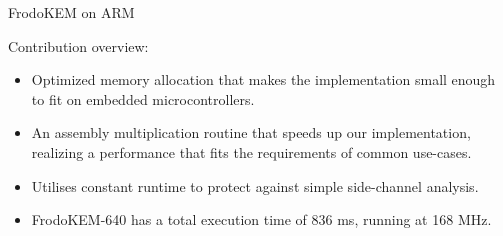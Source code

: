 \documentclass{beamer}            %
\begin{document}
\begin{frame}{FrodoKEM on ARM}

Contribution overview:

\begin{itemize}
\item Optimized memory allocation that makes the implementation small enough to fit on embedded microcontrollers.

\item An assembly multiplication routine that speeds up our implementation, realizing a performance that fits the requirements of common use-cases.

\item Utilises constant runtime to protect against simple side-channel analysis.

\item \textsf{FrodoKEM-640} has a total execution time of 836 ms, running at 168 MHz.

\end{itemize}
\end{frame}

\end{document}

